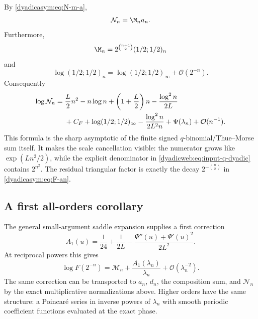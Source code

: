 \documentclass[11pt,oneside]{article}
\theoremstyle{definition}
\theoremstyle{remark}
\newcommand{\bigO}{\mathcal O}
\begin{document}
By \eqref{dyadicasym:eq:N-m-a},
\begin{equation}
 \mathcal N_n=\M_na_n.                                      \label{dyadicasym:eq:N-product}
\end{equation}
Furthermore,
\begin{equation}
 \M_n=2^{\binom{n+1}{2}}(1/2;1/2)_n                       \label{dyadicasym:eq:M-q}
\end{equation}
and
\begin{equation}
 \log(1/2;1/2)_n=
 \log(1/2;1/2)_\infty+\bigO(2^{-n}).                       \label{dyadicasym:eq:qpoch-limit}
\end{equation}
Consequently
\begin{align}
 \log\mathcal N_n={}&\frac L2n^2-n\log n+
 \left(1+\frac L2\right)n-\frac{\log^2n}{2L}              \notag\\
 &+C_F+\log(1/2;1/2)_\infty
 -\frac{\log^2n}{2L^2n}+\Psi(\lambda_n)
 +\bigO(n^{-1}).                                            \label{dyadicasym:eq:N-asymptotic}
\end{align}
This formula is the sharp asymptotic of the finite signed $q$-binomial/Thue--Morse sum itself.
It makes the scale cancellation visible: the numerator grows like
$\exp(Ln^2/2)$, while the explicit denominator in \eqref{dyadicweb:eq:input-q-dyadic} contains
$2^{n^2}$.  The residual triangular factor is exactly the decay
$2^{-\binom n2}$ in \eqref{dyadicasym:eq:F-an}.

\subsection{A first all-orders corollary}

The general small-argument saddle expansion supplies a first correction
\begin{equation}
 A_1(u)=\frac1{24}+\frac1{2L}
 -\frac{\Psi''(u)+\Psi'(u)^2}{2L^2}.                        \label{dyadicasym:eq:A1-report}
\end{equation}
At reciprocal powers this gives
\begin{equation}
 \log F(2^{-n})=\mathcal M_n+
 \frac{A_1(\lambda_n)}{\lambda_n}+
 \bigO(\lambda_n^{-2}).                                    \label{dyadicasym:eq:first-correction-dyadic}
\end{equation}
The same correction can be transported to $a_n$, $d_n$, the composition sum, and
$\mathcal N_n$ by the exact multiplicative normalizations above.  Higher orders have the same
structure: a Poincar\'e series in inverse powers of $\lambda_n$ with smooth periodic
coefficient functions evaluated at the exact phase.
\end{document}
